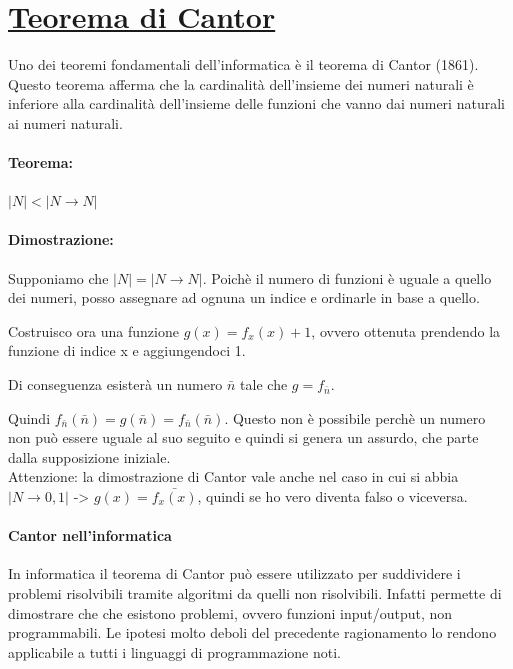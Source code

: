 \documentclass[a4paper, 10pt]{report}
\begin{document}
\section*{\underline{Teorema di Cantor}}
Uno dei teoremi fondamentali dell'informatica è il teorema di Cantor (1861). Questo teorema afferma che la cardinalità dell'insieme dei numeri naturali è inferiore alla cardinalità dell'insieme delle funzioni che vanno dai numeri naturali ai numeri naturali.\\

\begin{tcolorbox}
	\paragraph{Teorema:}
	\begin{center}
	$|N| < |N \rightarrow N|$
	\end{center}
	
	\paragraph{Dimostrazione:}
	Supponiamo che $|N| = |N \rightarrow N|$. Poichè il numero di funzioni è uguale a quello dei numeri, posso assegnare ad ognuna un indice e ordinarle in base a quello.
	
	Costruisco ora una funzione $g(x) = f_x(x)+1$, ovvero ottenuta prendendo la funzione di indice x e aggiungendoci 1.
	
	Di conseguenza esisterà un numero $\bar{n}$ tale che $g = f_{\bar{n}}$.
	
	Quindi $f_{\bar{n}}(\bar{n}) = g(\bar{n}) = f_{\bar{n}}(\bar{n})$. Questo non è possibile perchè un numero non può essere uguale al suo seguito e quindi si genera un assurdo, che parte dalla supposizione iniziale.\\
	
	Attenzione: la dimostrazione di Cantor vale anche nel caso in cui si abbia $|N \rightarrow {0, 1}|$ -> $g(x) = \bar{f_x(x)}$, quindi se ho vero diventa falso o viceversa. 
\end{tcolorbox}

\paragraph*{Cantor nell'informatica} In informatica il teorema di Cantor può essere utilizzato per suddividere i problemi risolvibili tramite algoritmi da quelli non risolvibili. Infatti permette di dimostrare che che esistono problemi, ovvero funzioni input/output, non
programmabili. Le ipotesi molto deboli del precedente ragionamento lo rendono applicabile
a tutti i linguaggi di programmazione noti.
\end{document}
